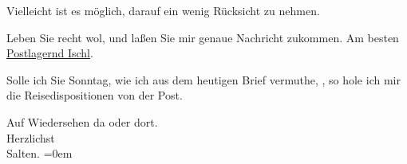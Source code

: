 \pstart
           Vielleicht ist es möglich, darauf ein wenig Rücksicht zu nehmen.\pend
           
\pstart
           {\pb}Leben Sie recht wol, und
               laßen Sie mir genaue Nachricht zukommen. Am besten \uline{Postlagernd Ischl}.\pend
           
\pstart
           Solle ich Sie Sonntag, wie ich aus dem heutigen Brief
               vermuthe, \label{K_L03308-4v}\label{K_L03308-4}, so hole ich mir die
               Reisedispositionen von der Post.\pend
           
\pstart
           Auf Wiedersehen da oder dort. {\\[\baselineskip]}Herzlichst {\\[\baselineskip]}\spacefill\mbox{Salten.}\pend
           \leftskip=0em{}\endnumbering{}  
      